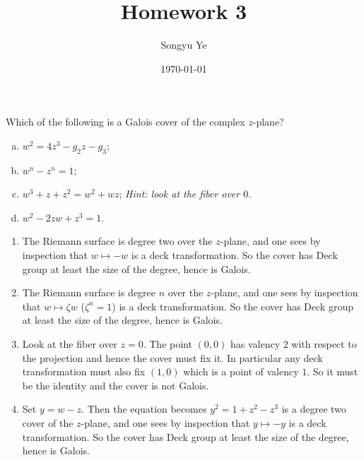 \documentclass[12pt]{article}  %
\title{Homework 3}
\author{Songyu Ye}
\date{\today}
\begin{document}
\psettitle


\begin{problem}[1]
Which of the following is a Galois cover of the complex $z$-plane?
\begin{enumerate}[(a)]
    \item $w^2 = 4z^3 - g_2z - g_3$;
    \item $w^n - z^n = 1$;
    \item $w^3 + z + z^2 = w^2 + wz$; \textit{Hint: look at the fiber over $0$.}
    \item $w^2 - 2zw + z^3 = 1$.
\end{enumerate}
\end{problem}

\begin{solution}
    \begin{enumerate}
        \item The Riemann surface is degree two over the $z$-plane, and one sees by inspection that $w\mapsto -w$ is a deck transformation. So the cover has Deck group at least the size of the degree, hence is Galois.  
	 \item The Riemann surface is degree $n$ over the $z$-plane, and one sees by inspection that $w\mapsto \zeta w$ ($\zeta^n=1$) is a deck transformation. So the cover has Deck group at least the size of the degree, hence is Galois.  
    \item Look at the fiber over $z=0$. The point $(0,0)$ has valency $2$ with respect to the projection and hence the cover must fix it. In particular any deck transformation must also fix $(1,0)$ which is a point of valency $1$. So it must be the identity and the cover is not Galois.
    \item Set $y = w - z$. Then the equation becomes $y^2 = 1 + z^2 - z^3$ is a degree two cover of the $z$-plane, and one sees by inspection that $y \mapsto -y$ is a deck transformation. So the cover has Deck group at least the size of the degree, hence is Galois.
    \end{enumerate}
\end{solution}
\end{document}
